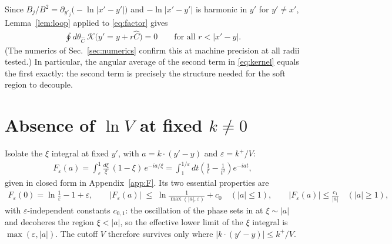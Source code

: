 \documentclass[11pt]{article}
\newcommand{\bB}{B}
\newcommand{\Chat}{\hat C}
\begin{document}
Since $\bB_j/\bB^2=\partial_{y'_j}\big(-\ln|x'-y'|\big)$ and
$-\ln|x'-y'|$ is harmonic in $y'$ for $y'\neq x'$, Lemma~\ref{lem:loop}
applied to \eqref{eq:factor} gives
\begin{align}
\oint d\theta_{\Chat}\,\mathcal K\big(y'=y+r\Chat\big)=0
\qquad\text{for all } r<|x'-y| .
\label{eq:loopzero}
\end{align}
(The numerics of Sec.~\ref{sec:numerics} confirm this at machine
precision at all radii tested.)  In particular, the angular average of
the second term in \eqref{eq:kernel} equals the first exactly: the
second term is precisely the structure needed for the soft region to
decouple.

\section{Absence of $\ln V$ at fixed $k\neq0$}
\label{sec:finite}

Isolate the $\xi$ integral at fixed $y'$, with $a=k\cdot(y'-y)$ and
$\varepsilon=k^+/V$:
\begin{align}
F_\varepsilon(a)=\int_{\varepsilon}^{1}\frac{d\xi}{\xi}\,(1-\xi)\,
e^{-ia/\xi}
=\int_{1}^{1/\varepsilon}dt\left(\frac1t-\frac1{t^{2}}\right)e^{-iat},
\label{eq:F}
\end{align}
given in closed form in Appendix~\ref{app:F}.  Its two essential
properties are
\begin{align}
F_\varepsilon(0)=\ln\frac1\varepsilon-1+\varepsilon ,
\qquad
\big|F_\varepsilon(a)\big|\;\le\;
\ln\frac{1}{\max(|a|,\varepsilon)}+c_0\quad(|a|\le1),
\qquad
\big|F_\varepsilon(a)\big|\le\frac{c_1}{|a|}\quad(|a|\ge1),
\label{eq:Fbounds}
\end{align}
with $\varepsilon$-independent constants $c_{0,1}$: the oscillation of
the phase sets in at $\xi\sim|a|$ and decoheres the region $\xi<|a|$, so
the effective lower limit of the $\xi$ integral is
$\max(\varepsilon,|a|)$.  The cutoff $V$ therefore survives only where
$|k\cdot(y'-y)|\le k^+/V$.
\end{document}
